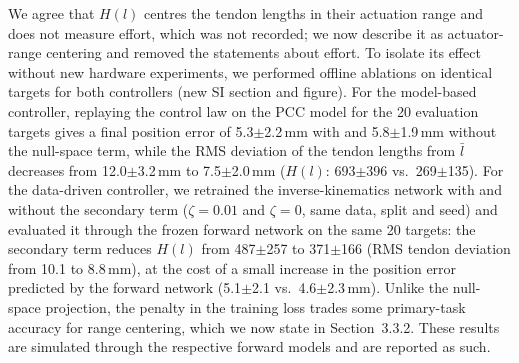 \documentclass[10pt,a4paper]{article}
\begin{document}
\begin{resp}
We agree that $H(l)$ centres the tendon lengths in their actuation range and does not measure effort, which was not recorded; we now describe it as actuator-range centering and removed the statements about effort. To isolate its effect without new hardware experiments, we performed offline ablations on identical targets for both controllers (new SI section and figure). For the model-based controller, replaying the control law on the PCC model for the 20 evaluation targets gives a final position error of 5.3$\pm$2.2\,mm with and 5.8$\pm$1.9\,mm without the null-space term, while the RMS deviation of the tendon lengths from $\bar l$ decreases from 12.0$\pm$3.2\,mm to 7.5$\pm$2.0\,mm ($H(l)$: 693$\pm$396 vs.\ 269$\pm$135). For the data-driven controller, we retrained the inverse-kinematics network with and without the secondary term ($\zeta=0.01$ and $\zeta=0$, same data, split and seed) and evaluated it through the frozen forward network on the same 20 targets: the secondary term reduces $H(l)$ from 487$\pm$257 to 371$\pm$166 (RMS tendon deviation from 10.1 to 8.8\,mm), at the cost of a small increase in the position error predicted by the forward network (5.1$\pm$2.1 vs.\ 4.6$\pm$2.3\,mm). Unlike the null-space projection, the penalty in the training loss trades some primary-task accuracy for range centering, which we now state in Section~3.3.2. These results are simulated through the respective forward models and are reported as such.
\end{resp}
\end{document}

